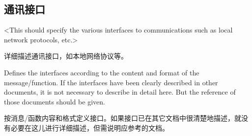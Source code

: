 \subsection{通讯接口}
<This should specify the various interfaces to communications such as local network protocols, etc.>

详细描述通讯接口，如本地网络协议等。

Defines the interfaces according to the content and format of the message/function. If the interfaces have been clearly described in other documents, it is not necessary to describe in detail here. But the reference of those documents should be given.

按消息/函数内容和格式定义接口。如果接口已在其它文档中很清楚地描述，就没有必要在这儿进行详细描述，但需说明应参考的文档。
